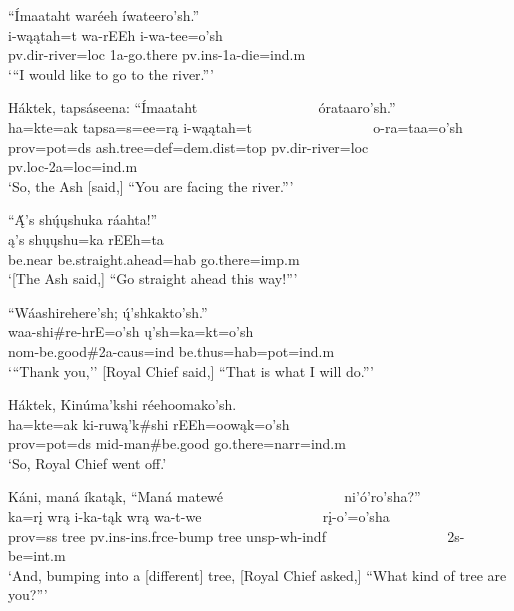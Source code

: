 \begin{exe}
\item\label{EJ80} \glll ``Ímaataht waréeh íwateero'sh.''\\
i-wąątah=t wa-rEEh i-wa-tee=o'sh\\
pv.dir-\textnormal{river}=loc 1a-\textnormal{go.there} pv.ins-1a-\textnormal{die}=ind.m\\
\glt `{``}I would like to go to the river.{''}'

\item\label{EJ81} \glll Háktek, tapsáseena: ``Ímaataht ~ ~ ~ ~ ~ ~ ~ ~ ~ ~ órataaro'sh.''\\
ha=kte=ak tapsa=s=ee=rą i-wąątah=t ~ ~ ~ ~ ~ ~ ~ ~ ~ ~ o-ra=taa=o'sh\\
prov=pot=ds \textnormal{ash.tree}=def=dem.dist=top pv.dir-\textnormal{river}=loc ~ ~ ~ ~ ~ ~ ~ ~ ~ ~ pv.loc-2a=loc=ind.m\\
\glt `So, the Ash [said,] ``You are facing the river.{''}'

\item\label{EJ82} \glll ``Ą́'s shų́ųshuka ráahta!''\\
ą's shųųshu=ka rEEh=ta\\
\textnormal{be.near} \textnormal{be.straight.ahead}=hab \textnormal{go.there}=imp.m\\
\glt `[The Ash said,] {``}Go straight ahead this way!{''}'

\item\label{EJ83} \glll ``Wáashirehere'sh; ų́'shkakto'sh.''\\
waa-shi\#re-hrE=o'sh ų'sh=ka=kt=o'sh\\
nom-\textnormal{be.good}\#2a-caus=ind \textnormal{be.thus}=hab=pot=ind.m\\
\glt `{``}Thank you,'' [Royal Chief said,] ``That is what I will do.{''}'

\item\label{EJ84} \glll Háktek, Kinúma'kshi réehoomako'sh.\\
ha=kte=ak ki-ruwą'k\#shi rEEh=oowąk=o'sh\\
prov=pot=ds mid-\textnormal{man}\#\textnormal{be.good} \textnormal{go.there}=narr=ind.m\\
\glt `So, Royal Chief went off.'

\item\label{EJ85} \glll Káni, maná íkatąk, ``Maná matewé ~ ~ ~ ~ ~ ~ ~ ~ ~ ~ ni'ó'ro'sha?''\\
ka=rį wrą i-ka-tąk wrą wa-t-we ~ ~ ~ ~ ~ ~ ~ ~ ~ ~ rį-o'=o'sha\\
prov=ss \textnormal{tree} pv.ins-ins.frce-\textnormal{bump} \textnormal{tree} unsp-wh-indf ~ ~ ~ ~ ~ ~ ~ ~ ~ ~ 2s-\textnormal{be}=int.m\\
\glt `And, bumping into a [different] tree, [Royal Chief asked,] ``What kind of tree are you?{''}'


\end{exe}
